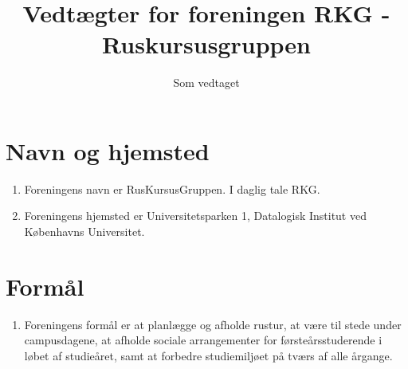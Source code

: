\documentclass[a4paper, 10pt]{article}
\title{Vedtægter for foreningen RKG - Ruskursusgruppen}
\author{}
\date{Som vedtaget \vedtagsdato{}}
\renewcommand\thesection{\textsection\arabic{section}}
\newenvironment{stykenum}{
  \begin{enumerate}[%
    label=Stk.~\arabic*:, ref=\thesection~Stk.~\arabic{enumi}, start=1]
}{\end{enumerate}}
\begin{document}
\maketitle
\thispagestyle{first}

\section{Navn og hjemsted}
\begin{stykenum}
    \item \label{navn} Foreningens navn er RusKursusGruppen. I daglig tale RKG.

    \item \label{hjemsted} Foreningens hjemsted er Universitetsparken 1,
        Datalogisk Institut ved Københavns Universitet.

\end{stykenum}

\section{Formål}
\begin{stykenum}
\item \label{formaal} Foreningens formål er at planlægge og afholde  rustur, at
    være til stede under campusdagene, at afholde sociale arrangementer for
    førsteårsstuderende i løbet af studieåret,  samt at forbedre studiemiljøet
    på tværs af alle årgange.
\end{stykenum}
\end{document}
